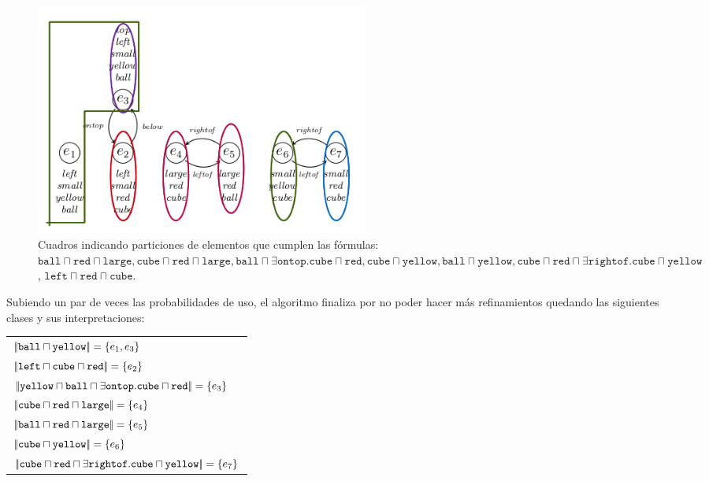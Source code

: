 \begin{figure}[H]
\begin{center}
\includegraphics[width=11cm]{images/im/left.png}
\caption{Cuadros indicando particiones de elementos que cumplen las f\'ormulas: $\texttt{ball} \sqcap \texttt{red} \sqcap \texttt{large}, \texttt{cube} \sqcap \texttt{red} \sqcap \texttt{large},\texttt{ball} \sqcap \exists \texttt{ontop}. \texttt{cube} \sqcap \texttt{red}, \texttt{cube} \sqcap \texttt{yellow}, \texttt{ball} \sqcap \texttt{yellow}, \texttt{cube} \sqcap \texttt{red} \sqcap \exists \texttt{rightof}. \texttt{cube} \sqcap \texttt{yellow}$, $\texttt{left} \sqcap \texttt{red} \sqcap \texttt{cube}$.}
\label{fig-modelo9f}
\end{center}
\end{figure}

Subiendo un par de veces las probabilidades de uso, el algoritmo finaliza por no poder hacer m\'as refinamientos quedando las siguientes clases y sus interpretaciones:

\medskip
\begin{tabular}{l}
$|\!|\texttt{ball} \sqcap \texttt{yellow}|\!| = \{e_1, e_3\}$  \\
$|\!|\texttt{left} \sqcap \texttt{cube} \sqcap \texttt{red}|\!| = \{e_2\}$ \\
$|\!|\texttt{yellow} \sqcap \texttt{ball} \sqcap \exists \texttt{ontop}.\texttt{cube} \sqcap \texttt{red}|\!| = \{e_3\}$ \\
$|\!|\texttt{cube} \sqcap \texttt{red} \sqcap \texttt{large}|\!| = \{e_4\}$  \\
$|\!|\texttt{ball} \sqcap \texttt{red} \sqcap \texttt{large}|\!| = \{e_5\}$ \\
$|\!|\texttt{cube} \sqcap \texttt{yellow} |\!|= \{e_6\}$ \\
$|\!|\texttt{cube} \sqcap \texttt{red} \sqcap \exists \texttt{rightof}. \texttt{cube} \sqcap \texttt{yellow}|\!| = \{e_7\}$
\end{tabular}
\medskip

